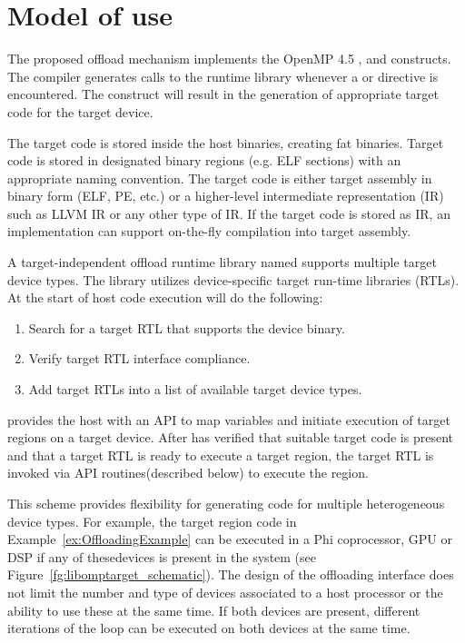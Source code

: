 \section{Model of use}

The proposed offload mechanism implements the OpenMP 4.5 \dtargetdata{}, \dtarget{} and \ddeclaretarget{} constructs. The compiler generates calls to the runtime library whenever a \dtargetdata{} or \dtarget{} directive is encountered. The \ddeclaretarget{} construct will result in the generation of appropriate target code for the target device.

The target code is stored inside the host binaries, creating fat binaries. Target code is stored in designated binary regions (e.g. ELF sections) with an appropriate naming convention. The target code is either target assembly in binary form (ELF, PE, etc.) or a higher-level intermediate representation (IR) such as LLVM IR or any other type of IR. If the target code is stored as IR, an implementation can support on-the-fly compilation into target assembly.

A target-independent offload runtime library named \libomptarget{} supports multiple target device types. The \libomptarget{} library utilizes device-specific target run-time libraries (RTLs). At the start of host code execution \libomptarget{} will do the following:

\begin{enumerate}
  \item Search for a target RTL that supports the device binary. 

  \item Verify target RTL interface compliance.

  \item Add target RTLs into a list of available target device types. 
\end{enumerate}

\libomptarget{} provides the host with an API to map variables and initiate execution of target regions on a target device. After \libomptarget{} has verified that suitable target code is present and that a target RTL is ready to execute a target region, the target RTL is invoked via API routines(described below) to execute the region.

This scheme provides flexibility for generating code for multiple heterogeneous device types. For example, the target region code in Example~\ref{ex:OffloadingExample} can be executed in a Phi\texttrademark{} coprocessor, GPU or DSP if any of thesedevices is present in the system (see Figure~\ref{fg:libomptarget_schematic}). The design of the offloading interface does not limit the number and type of devices associated to a host processor or the ability to use these at the same time. If both devices are present, different iterations of the loop can be executed on both devices at the same time.

